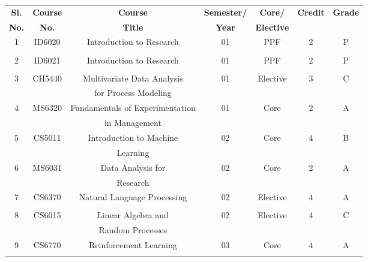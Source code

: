 \documentclass[12pt]{article}
\begin{document}
\begin{tabular}{|c|c|c|c|c|c|c|}
  \hline
  \textbf{Sl.} & \textbf{Course} & \textbf{Course} & \textbf{Semester/} & \textbf{Core/} & \textbf{Credit} & \textbf{Grade} \\
  \textbf{No.} & \textbf{No.} & \textbf{Title} & \textbf{Year} & \textbf{Elective} &  & \\\hline
  
  
  
  1 & ID6020 & Introduction to Research & 01 & PPF & 2 &  P\\
    &        &  &    &     &   &   \\\hline
 
  2 & ID6021 & Introduction to Research & 01 & PPF & 2 & P\\
    &        &                     &    &          &   &  \\\hline
  3 & CH5440 & Multivariate Data Analysis & 01 & Elective & 3 & C \\
    &        & for Process Modeling &    &          &   &   \\\hline
  4 & MS6320 & Fundamentals of Experimentation & 01 & Core & 2 & A \\
    &        & in Management &    &      &   &   \\\hline
  5 & CS5011 & Introduction to Machine& 02 & Core & 4 & B \\
    &        & Learning                   &    &          &   &   \\\hline
  6 & MS6031 & Data Analysis for& 02 & Core & 2 & A \\
    &        & Research  &    &      &   &   \\\hline
  7 & CS6370 & Natural Language Processing & 02 & Elective & 4 & A \\
    &        &                            &    &          &   &   \\\hline
  8 & CS6015 & Linear Algebra and & 02 & Elective & 4 & C \\
    &        & Random Processes                          &    &          &   &   \\\hline
  9 & CS6770 & Reinforcement Learning & 03 & Core & 4 & A \\
    &        &                            &    &          &   &   \\\hline
\end{tabular}
\\
\\
\\\
\end{document}
